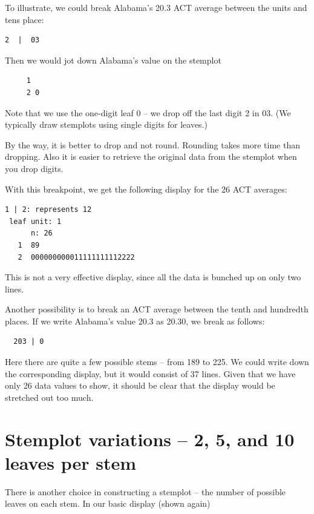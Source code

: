 \documentclass[
]{book}
\begin{document}
To illustrate, we could break Alabama's 20.3 ACT average between the units and tens place:

\begin{verbatim}
2  |  03
\end{verbatim}

Then we would jot down Alabama's value on the stemplot

\begin{verbatim}
     1 
     2 0
\end{verbatim}

Note that we use the one-digit leaf 0 -- we drop off the last digit 2 in 03. (We typically draw stemplots using single digits for leaves.)

By the way, it is better to drop and not round. Rounding takes more time than dropping. Also it is easier to retrieve the original data from the stemplot when you drop digits.

With this breakpoint, we get the following display for the 26 ACT averages:

\begin{verbatim}
1 | 2: represents 12
 leaf unit: 1
      n: 26
   1  89
   2  000000000011111111112222
\end{verbatim}

This is not a very effective display, since all the data is bunched up on only two lines.

Another possibility is to break an ACT average between the tenth and hundredth places. If we write Alabama's value 20.3 as 20.30, we break as follows:

\begin{verbatim}
  203 | 0
\end{verbatim}

Here there are quite a few possible stems -- from 189 to 225. We could write down the corresponding display, but it would consist of 37 lines. Given that we have only 26 data values to show, it should be clear that the display would be stretched out too much.

\hypertarget{stemplot-variations-2-5-and-10-leaves-per-stem}{%
\section{Stemplot variations -- 2, 5, and 10 leaves per stem}\label{stemplot-variations-2-5-and-10-leaves-per-stem}}

There is another choice in constructing a stemplot -- the number of possible leaves on each stem. In our basic display (shown again)
\end{document}
